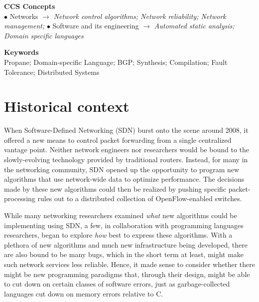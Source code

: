 \documentclass[10pt]{sigalternate052015}
\begin{document}
\vspace{0.1in}
\noindent
\textbf{CCS Concepts}\\
$\bullet$ Networks $\rightarrow$ {\em Network control algorithms; Network reliability; Network management;} 
$\bullet$ Software and its engineering $\rightarrow$ {\em Automated static analysis; Domain specific languages}

\vspace{0.1in}
\noindent
\textbf{Keywords}\\
Propane; Domain-specific Language; BGP; Synthesis; Compilation; Fault Tolerance; Distributed Systems




\section{Historical context}

When Software-Defined Networking (SDN) burst onto the scene around 2008,
it offered a new means to control packet forwarding  from a single
centralized vantage point.  Neither network engineers nor 
researchers would be bound to the slowly-evolving technology provided by
traditional routers.  Instead, for many in the networking
community, SDN opened up the opportunity to program new
algorithms that use network-wide data to optimize performance.
The decisions made by these new algorithms could then be realized by
pushing specific packet-processing rules out to a distributed
collection of  OpenFlow-enabled switches.

While many networking researchers examined \emph{what} new algorithms
could be implementing using SDN, a few, in collaboration
with programming languages researchers, began to explore \emph{how}
best to express these algorithms.  With a plethora of new algorithms
and much new infrastructure being developed, there are also bound to
be many bugs, which in the short term at least, might make such network
services less reliable.  Hence, it made sense to consider
whether there might be new programming paradigms that, through their
design, might be able to cut down on certain classes of software
errors, just as garbage-collected languages cut
down on memory errors relative to C.
\end{document}
